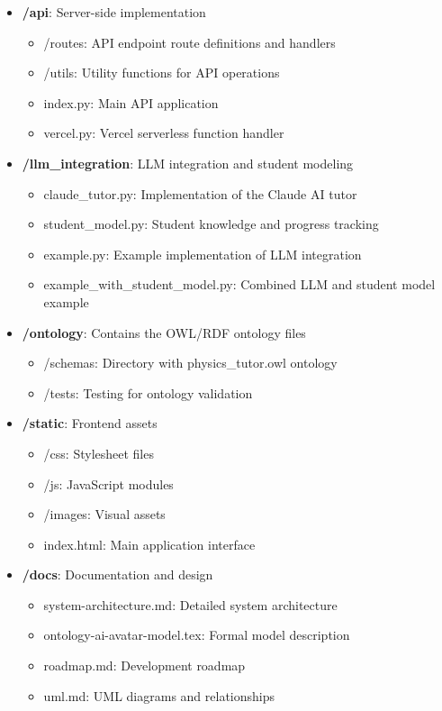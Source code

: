 \begin{itemize}
  \item \textbf{/api}: Server-side implementation
    \begin{itemize}
      \item /routes: API endpoint route definitions and handlers
      \item /utils: Utility functions for API operations
      \item index.py: Main API application
      \item vercel.py: Vercel serverless function handler
    \end{itemize}
  
  \item \textbf{/llm\_integration}: LLM integration and student modeling
    \begin{itemize}
      \item claude\_tutor.py: Implementation of the Claude AI tutor
      \item student\_model.py: Student knowledge and progress tracking
      \item example.py: Example implementation of LLM integration
      \item example\_with\_student\_model.py: Combined LLM and student model example
    \end{itemize}
  
  \item \textbf{/ontology}: Contains the OWL/RDF ontology files
    \begin{itemize}
      \item /schemas: Directory with physics\_tutor.owl ontology
      \item /tests: Testing for ontology validation
    \end{itemize}
  
  \item \textbf{/static}: Frontend assets
    \begin{itemize}
      \item /css: Stylesheet files
      \item /js: JavaScript modules
      \item /images: Visual assets
      \item index.html: Main application interface
    \end{itemize}
  
  \item \textbf{/docs}: Documentation and design
    \begin{itemize}
      \item system-architecture.md: Detailed system architecture
      \item ontology-ai-avatar-model.tex: Formal model description
      \item roadmap.md: Development roadmap
      \item uml.md: UML diagrams and relationships
    \end{itemize}
  

\end{itemize}
